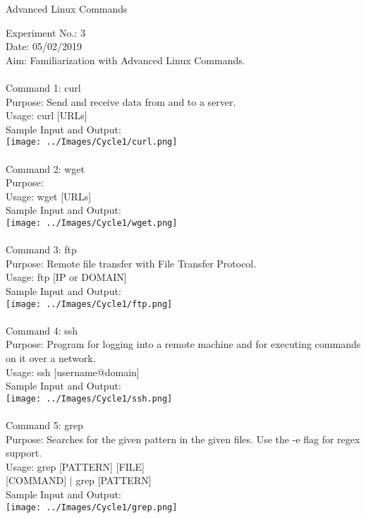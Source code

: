 \documentclass[10pt,a4paper]{report}
\begin{document}
\begin{center}
\begin{Large}
Advanced Linux Commands
\end{Large}
\end{center}
Experiment No.: 3\\
Date: 05/02/2019\\
Aim: Familiarization with Advanced Linux Commands.\\
\\
Command 1: curl\\
Purpose: Send and receive data from and to a server.\\
Usage: curl [URLs]\\
Sample Input and Output: \\
\texttt{[image: ../Images/Cycle1/curl.png]}\\
\\
Command 2: wget\\
Purpose: \\
Usage: wget [URLs]\\
Sample Input and Output: \\
\texttt{[image: ../Images/Cycle1/wget.png]}\\
\\
Command 3: ftp\\
Purpose: Remote file transfer with File Transfer Protocol.\\
Usage: ftp [IP or DOMAIN]\\
Sample Input and Output: \\
\texttt{[image: ../Images/Cycle1/ftp.png]}\\
\pagebreak
\\
Command 4: ssh\\
Purpose: Program for logging into a remote machine and for executing commands on it over a network.\\
Usage: ssh [username@domain]\\
Sample Input and Output: \\
\texttt{[image: ../Images/Cycle1/ssh.png]}\\
\\
Command 5: grep\\
Purpose: Searches for the given pattern in the given files. Use the -e flag for regex support.\\
Usage: grep [PATTERN] [FILE]\\
{[COMMAND]} $|$ grep [PATTERN]\\
Sample Input and Output: \\
\texttt{[image: ../Images/Cycle1/grep.png]}
\end{document}
